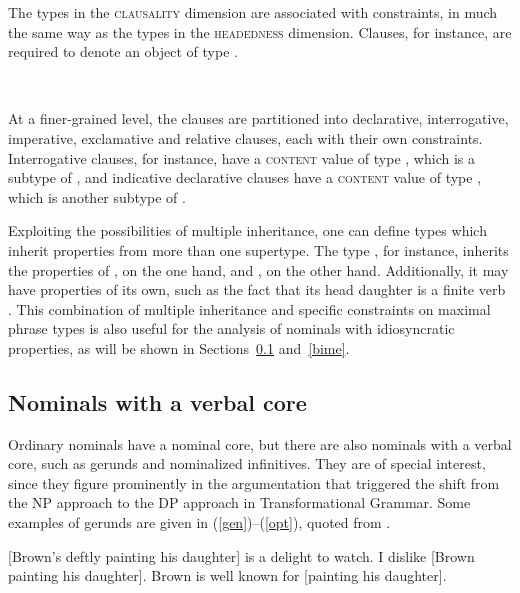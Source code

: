 \documentclass[output=paper
	        ,collection
	        ,collectionchapter
 	        ,biblatex
                ,babelshorthands
                ,newtxmath
                ,draftmode
                ,colorlinks, citecolor=brown
]{langscibook}
\begin{document}
The types in the \textsc{clausality} dimension are associated with constraints,
in much the same way as the types in the \textsc{headedness} dimension.  
Clauses, for instance, are required to denote an object of type  
\citep[41]{GS00}.

\begin{exe}
\ex {} ~ \impl ~ 
\begin{avm}
\end{avm}
\end{exe}

\noindent
At a finer-grained level, the clauses are partitioned into 
declarative, interrogative, imperative, exclamative and relative
clauses, each with their own constraints. 
Interrogative clauses, for instance, have a \textsc{content} value of type 
, which is a subtype of , and 
indicative declarative clauses have a \textsc{content} value of type 
, which is another subtype of .

Exploiting the possibilities of multiple inheritance, one can 
define types which inherit properties from more than one supertype. 
The type , for instance, inherits 
the properties of , on the one hand, and 
, on the other hand. Additionally, it may 
have properties of its own, such as the fact that its head daughter 
is a finite verb \citep[43]{GS00}. 
This combination of multiple inheritance and specific   
constraints on maximal phrase types is also useful for the analysis of 
nominals with idiosyncratic properties, as will be shown in Sections~\ref{geru} 
and~\ref{bime}. 


\subsection{Nominals with a verbal core} 
\label{geru}


Ordinary nominals have a nominal core, but there are also nominals  
with a verbal core, such as gerunds and nominalized infinitives. They are 
of special interest, since they figure prominently in the argumentation 
that triggered the shift from the NP approach to the DP approach in Transformational 
Grammar. Some examples of gerunds are given in (\ref{gen})--(\ref{opt}), 
quoted from \citet[1290]{Quirketal85}. 

\begin{exe} 
\ex\label{gen}  {}[Brown's deftly painting his daughter] is a delight to watch. 
\ex\label{np:ex-acc}  I dislike [Brown painting his daughter]. 
\ex\label{opt}  Brown is well known for [painting his daughter].
\end{exe}
\end{document}
